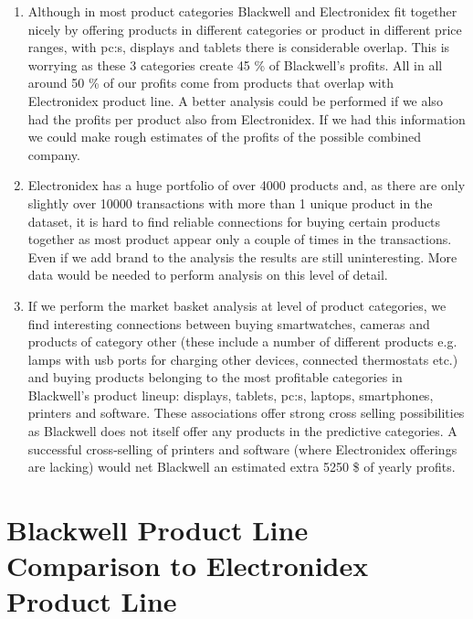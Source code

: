 \documentclass[12pt,a4paper,leqno]{report}
\theoremstyle{plain}
\theoremstyle{definition}
\theoremstyle{remark}
\begin{document}
\begin{enumerate}
    
    \item Although in most product categories Blackwell and Electronidex fit together nicely by offering products in different categories or
    product in different price ranges, with pc:s, displays and tablets there is considerable overlap. This is worrying as these 3
    categories create 45 \% of Blackwell's profits. All in all around 50 \% of our profits come from products that
    overlap with Electronidex product line. A better analysis could be performed if we also had the profits per product
    also from Electronidex. If we had this information we could make rough estimates of the profits of the
    possible combined company.

    \item Electronidex has a huge portfolio of over 4000 products and, as there are only slightly over 10000
    transactions with more than 1 unique product in the dataset, it is hard to find reliable connections for
    buying certain products together as most product appear only a couple of times in the transactions.
    Even if we add brand to the analysis the results are still uninteresting.
    More data would be needed to perform analysis on this level of detail.

    \item If we perform the market basket analysis at level of product categories, we find interesting
    connections between buying smartwatches, cameras and products of category other (these include
    a number of different products e.g. lamps with usb ports for charging other devices, connected
    thermostats etc.) and buying products belonging to the most profitable categories
    in Blackwell's product lineup: displays, tablets, pc:s, laptops, smartphones, printers and software.
    These associations offer strong cross selling possibilities as Blackwell does not itself
    offer any products in the predictive categories. A successful cross-selling of printers and
    software (where Electronidex offerings are lacking) would net Blackwell an estimated extra 5250 \$
    of yearly profits.
   
\end{enumerate}

\section{Blackwell Product Line Comparison to Electronidex Product Line}
\end{document}
